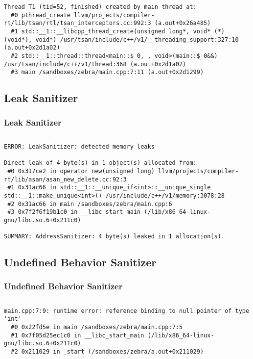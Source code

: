 \begin{frame}[fragile]
\begin{Verbatim}[fontsize=\tiny]
Thread T1 (tid=52, finished) created by main thread at:
  #0 pthread_create llvm/projects/compiler-rt/lib/tsan/rtl/tsan_interceptors.cc:992:3 (a.out+0x26a485)
  #1 std::__1::__libcpp_thread_create(unsigned long*, void* (*)(void*), void*) /usr/tsan/include/c++/v1/__threading_support:327:10 (a.out+0x2d1a02)
  #2 std::__1::thread::thread<main::$_0, , void>(main::$_0&&) /usr/tsan/include/c++/v1/thread:368 (a.out+0x2d1a02)
  #3 main /sandboxes/zebra/main.cpp:7:11 (a.out+0x2d1299)

  \end{Verbatim}
\end{frame}

\subsection{Leak Sanitizer}
\begin{frame}[fragile]
\frametitle{Leak Sanitizer}
  \inputminted[fontsize=\scriptsize,linenos]{cpp}{snippets/leak.cpp}
\pause
  \begin{Verbatim}[fontsize=\tiny]
ERROR: LeakSanitizer: detected memory leaks

Direct leak of 4 byte(s) in 1 object(s) allocated from:
 #0 0x317ce2 in operator new(unsigned long) llvm/projects/compiler-rt/lib/asan/asan_new_delete.cc:92:3
 #1 0x31ac66 in std::__1::__unique_if<int>::__unique_single std::__1::make_unique<int>() /usr/include/c++/v1/memory:3078:28
 #2 0x31ac66 in main /sandboxes/zebra/main.cpp:6
 #3 0x7f2f6f19b1c0 in __libc_start_main (/lib/x86_64-linux-gnu/libc.so.6+0x211c0)

SUMMARY: AddressSanitizer: 4 byte(s) leaked in 1 allocation(s).
  \end{Verbatim}
\end{frame}

\subsection{Undefined Behavior Sanitizer}
\begin{frame}[fragile]
\frametitle{Undefined Behavior Sanitizer}
  \inputminted[fontsize=\scriptsize,linenos]{cpp}{snippets/ub.cpp}
\pause
  \begin{Verbatim}[fontsize=\tiny]
main.cpp:7:9: runtime error: reference binding to null pointer of type 'int'
  #0 0x22fd5e in main /sandboxes/zebra/main.cpp:7:5
  #1 0x7f05d25ec1c0 in __libc_start_main (/lib/x86_64-linux-gnu/libc.so.6+0x211c0)
  #2 0x211029 in _start (/sandboxes/zebra/a.out+0x211029)
  \end{Verbatim}
\end{frame}

